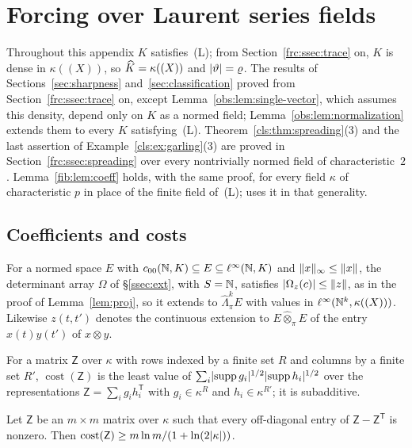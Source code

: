 \section{Forcing over Laurent series fields}\label{app:forcing}

Throughout this appendix $K$ satisfies~\textup{(L)}; from Section~\ref{frc:ssec:trace} on, $K$ is dense in $\kappa((X))$,
so $\widehat K=\kappa((X))$ and $\lvert \vartheta\rvert=\varrho$. The results of Sections~\ref{sec:sharpness} and~\ref{sec:classification}
proved from Section~\ref{frc:ssec:trace} on, except Lemma~\ref{obs:lem:single-vector}, which assumes this density, depend
only on $K$ as a normed field; Lemma~\ref{obs:lem:normalization} extends them to every $K$ satisfying~\textup{(L)}.
Theorem~\ref{cls:thm:spreading}(3) and the last assertion of Example~\ref{cls:ex:garling}(3) are proved in
Section~\ref{frc:ssec:spreading} over every nontrivially normed field of characteristic~$2$. Lemma~\ref{fib:lem:coeff}
holds, with the same proof, for every field $\kappa$ of characteristic $p$ in place of the finite field
of~\textup{(L)}; \cite{II} uses it in that generality.

\subsection{Coefficients and costs}\label{frc:ssec:costs}
For a normed space $E$ with $c_{00}(\mathbb N,K)\subseteq E\subseteq\ell^\infty(\mathbb N,K)$ and $\lVert x\rVert_\infty\le\lVert x\rVert$, the determinant
array $\Omega$ of \S\ref{ssec:ext}, with $S=\mathbb N$, satisfies $\lvert \Omega_z(c)\rvert\le\lVert z\rVert$, as in the proof of
Lemma~\ref{lem:proj}, so it extends to $\widehat\Lambda^k_\pi E$ with values in $\ell^\infty(\mathbb N^k,\kappa((X)))$. Likewise
$z(t,t')$ denotes the continuous extension to $E\widehat\otimes_\pi E$ of the entry $x(t)y(t')$ of $x\otimes y$.

For a matrix $\mathsf Z$ over $\kappa$ with rows indexed by a finite set $R$ and columns by a finite set $R'$,
$\operatorname{cost}(\mathsf Z)$ is the least value of
$\sum_i\lvert \operatorname{supp}g_i\rvert^{1/2}\lvert \operatorname{supp}h_i\rvert^{1/2}$ over the representations
$\mathsf Z=\sum_ig_ih_i^{\mathsf T}$ with $g_i\in\kappa^R$ and $h_i\in\kappa^{R'}$; it is subadditive.

\begin{lemma}\label{fib:lem:tournament}
Let $\mathsf Z$ be an $m\times m$ matrix over $\kappa$ such that every off-diagonal entry of $\mathsf Z-\mathsf Z^{\mathsf T}$ is nonzero. Then
$\operatorname{cost}(\mathsf Z)\ge m\ln m/(1+\ln(2\lvert \kappa\rvert))$.
\end{lemma}

